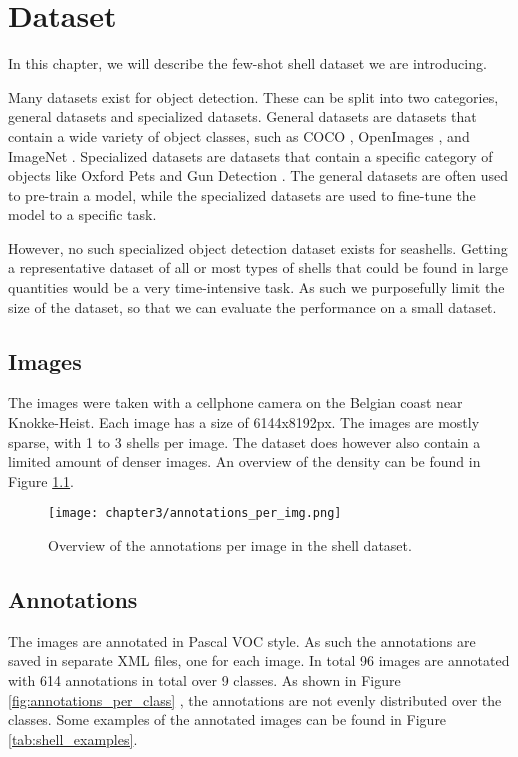 \chapter{Dataset}
In this chapter, we will describe the few-shot shell dataset we are introducing.

Many datasets exist for object detection. These can be split into two categories, general datasets and specialized datasets. General datasets are datasets that contain a wide variety of object classes, such as COCO \cite{COCO}, OpenImages \cite{OpenImages}, and ImageNet \cite{ImageNet}. Specialized datasets are datasets that contain a specific category of objects like Oxford Pets \cite{OxfordPets} and Gun Detection \cite{Gundetection}. The general datasets are often used to pre-train a model, while the specialized datasets are used to fine-tune the model to a specific task.

However, no such specialized object detection dataset exists for seashells. Getting a representative dataset of all or most types of shells that could be found in large quantities would be a very time-intensive task. As such we purposefully limit the size of the dataset, so that we can evaluate the performance on a small dataset. 

\section{Images}
The images were taken with a cellphone camera on the Belgian coast near Knokke-Heist. Each image has a size of 6144x8192px. The images are mostly sparse, with 1 to 3 shells per image. The dataset does however also contain a limited amount of denser images. An overview of the density can be found in Figure \ref{fig:annotations_per_img}. 

\begin{figure}[H]
    \centering
    \texttt{[image: chapter3/annotations\_per\_img.png]}
    \caption{Overview of the annotations per image in the shell dataset.}
    \label{fig:annotations_per_img}
\end{figure}

\section{Annotations}
The images are annotated in Pascal VOC \cite{PASCALVOC} style. As such the annotations are saved in separate XML files, one for each image. In total 96 images are annotated with 614 annotations in total over 9 classes. As shown in Figure \ref{fig:annotations_per_class}%
, the annotations are not evenly distributed over the classes. Some examples of the annotated images can be found in Figure \ref{tab:shell_examples}.


